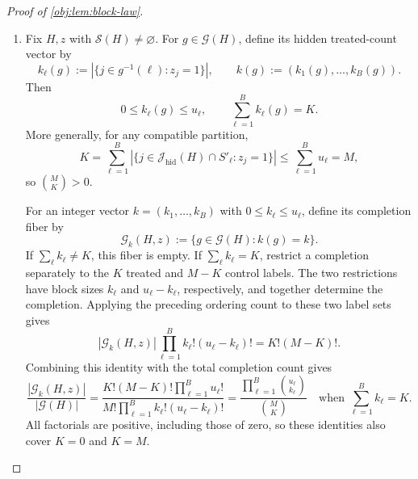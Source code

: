\begin{proof}[Proof of \cref{obj:lem:block-law}]
\begin{enumerate}
Define the hidden-label completion space by
\[
\mathcal G(H):=
\left\{g:\mathcal J_{\mathrm{hid}}(H)\to\{1,\ldots,B\}:
|g^{-1}(\ell)|=u_\ell\ \text{for every }\ell\right\}.
\]
Restriction to hidden labels and extension by the revealed labels give inverse maps
\[
\mathcal S(H)\longleftrightarrow\mathcal G(H),
\qquad
S'_\ell=\mathcal R_\ell(H)\cup g^{-1}(\ell).
\]
Count completions by ordering all \(M\) hidden labels and cutting the ordering into blocks of lengths \(u_1,\ldots,u_B\). Each completion arises from exactly \(\prod_\ell u_\ell!\) such orderings, because labels may be reordered within each block. Therefore
\[
|\mathcal G(H)|\prod_{\ell=1}^{B}u_\ell!=M!,
\qquad
\frac1{|\mathcal G(H)|}
=\frac{\prod_{\ell=1}^{B}u_\ell!}{M!}.
\]
The uniform compatible-partition average is consequently the same as the uniform hidden-label completion average. This identity includes \(M=0\), with \(0!=1\). For graphs with \(\mathcal S(H)=\varnothing\), the completion record measure is defined to be zero, as in the preceding step. %

\item Fix \(H,z\) with \(\mathcal S(H)\ne\varnothing\). For \(g\in\mathcal G(H)\), define its hidden treated-count vector by
\[
k_\ell(g):=|\{j\in g^{-1}(\ell):z_j=1\}|,
\qquad
k(g):=(k_1(g),\ldots,k_B(g)).
\]
Then
\[
0\le k_\ell(g)\le u_\ell,
\qquad
\sum_{\ell=1}^{B}k_\ell(g)=K.
\]
More generally, for any compatible partition,
\[
K
=\sum_{\ell=1}^{B}
|\{j\in\mathcal J_{\mathrm{hid}}(H)\cap S'_\ell:z_j=1\}|
\le\sum_{\ell=1}^{B}u_\ell=M,
\]
so \(\binom{M}{K}>0\).

For an integer vector \(k=(k_1,\ldots,k_B)\) with \(0\le k_\ell\le u_\ell\), define its completion fiber by
\[
\mathcal G_k(H,z):=\{g\in\mathcal G(H):k(g)=k\}.
\]
If \(\sum_\ell k_\ell\ne K\), this fiber is empty. If \(\sum_\ell k_\ell=K\), restrict a completion separately to the \(K\) treated and \(M-K\) control labels. The two restrictions have block sizes \(k_\ell\) and \(u_\ell-k_\ell\), respectively, and together determine the completion. Applying the preceding ordering count to these two label sets gives
\[
|\mathcal G_k(H,z)|
\prod_{\ell=1}^{B}k_\ell!(u_\ell-k_\ell)!
=K!(M-K)!.
\]
Combining this identity with the total completion count gives
\[
\frac{|\mathcal G_k(H,z)|}{|\mathcal G(H)|}
=
\frac{K!(M-K)!\prod_{\ell=1}^{B}u_\ell!}
{M!\prod_{\ell=1}^{B}k_\ell!(u_\ell-k_\ell)!}
=
\frac{\prod_{\ell=1}^{B}\binom{u_\ell}{k_\ell}}
{\binom{M}{K}}
\quad\text{when }\sum_{\ell=1}^{B}k_\ell=K.
\]
All factorials are positive, including those of zero, so these identities also cover \(K=0\) and \(K=M\).


\end{enumerate}
\end{proof}
